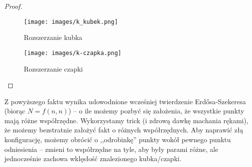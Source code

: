 \begin{proof}
	\begin{figure}[H]
		\centering
		\texttt{[image: images/k\_kubek.png]}
		\caption{Rozszerzanie kubka}
	\end{figure}


	\begin{figure}[H]
		\centering
		\texttt{[image: images/k-czapka.png]}
		\caption{Rozszerzanie czapki}
	\end{figure}
\end{proof}
Z powyższego faktu wynika udowodnione wcześniej twierdzenie Erd\H{o}sa-Szekeresa (biorąc \(N = f(n,n)\)) -- o ile możemy pozbyć się założenia, że wszystkie punkty mają różne współrzędne.
Wykorzystamy trick (i zdrową dawkę machania rękami), że możemy bezstratnie założyć fakt o różnych współrzędnych.
Aby naprawić złą konfigurację, możemy obrócić o ,,odrobinkę'' punkty wokół pewnego punktu odniesienia --
zmieni to współrzędne na tyle, aby były parami różne, ale jednocześnie zachowa wklęsłość znalezionego kubka/czapki.
